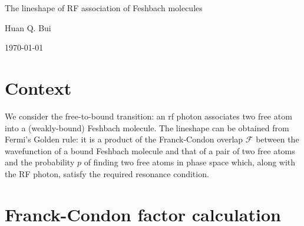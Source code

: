 \documentclass{article}
\theoremstyle{definition}
\begin{document}
\begin{center}
	\Large{The lineshape of RF association of Feshbach molecules}
\end{center}	
	
\begin{center}
	\large{Huan Q. Bui}
\end{center}

\begin{center}
	\today
\end{center}

\section{Context}

We consider the free-to-bound transition: an rf photon associates two free atom into a (weakly-bound) Feshbach molecule. The lineshape can be obtained from Fermi's Golden rule: it is a product of the Franck-Condon overlap $\mathcal{F}$ between the wavefunction of a bound Feshbach molecule and that of a pair of two free atoms and the probability $p$ of finding two free atoms in phase space which, along with the RF photon, satisfy the required resonance condition.

\section{Franck-Condon factor calculation}
\end{document}
